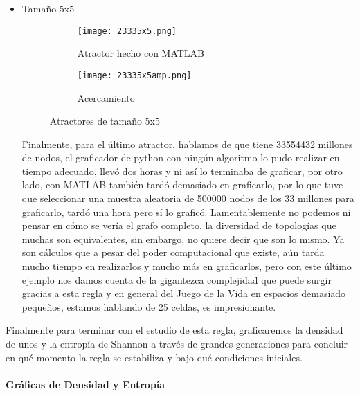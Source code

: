 \documentclass{article}
\begin{document}
\begin{itemize}
 	\item Tamaño 5x5
 	
 	\begin{figure}[htbp]
 		\centering
 		\begin{subfigure}{0.48\textwidth}
 			\centering
 			\texttt{[image: 23335x5.png]}
 			\caption{Atractor hecho con MATLAB}
 			\label{fig:A54}
 		\end{subfigure}
 		\hfill
 		\begin{subfigure}{0.48\textwidth}
 			\centering
 			\texttt{[image: 23335x5amp.png]}
 			\caption{Acercamiento}
 			\label{fig:A6}
 		\end{subfigure}
 		\caption{Atractores de tamaño 5x5}
 		\label{fig:A7}
 	\end{figure}
 	
 	Finalmente, para el último atractor, hablamos de que tiene 33554432 millones de nodos, el graficador de python con ningún algoritmo lo pudo realizar en tiempo adecuado, llevó dos horas y ni así lo terminaba de graficar, por otro lado, con MATLAB también tardó demasiado en graficarlo, por lo que tuve que seleccionar una muestra aleatoria de 500000 nodos de los 33 millones para graficarlo, tardó una hora pero sí lo graficó. Lamentablemente no podemos ni pensar en cómo se vería el grafo completo, la diversidad de topologías que muchas son equivalentes, sin embargo, no quiere decir que son lo mismo. Ya son cálculos que a pesar del poder computacional que existe, aún tarda mucho tiempo en realizarlos y mucho más en graficarlos, pero con este último ejemplo nos damos cuenta de la gigantezca complejidad que puede surgir gracias a esta regla y en general del Juego de la Vida en espacios demasiado pequeños, estamos hablando de 25 celdas, es impresionante. 
 
 \end{itemize}
 
 	Finalmente para terminar con el estudio de esta regla, graficaremos la densidad de unos y la entropía de Shannon a través de grandes generaciones para concluir en qué momento la regla se estabiliza y bajo qué condiciones iniciales. 
	\\
	\\
 	\textbf{Gráficas de Densidad y Entropía}
 
\end{document}
